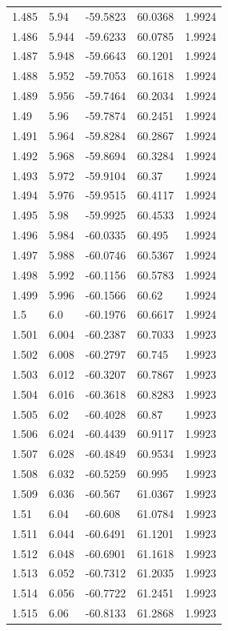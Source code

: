 \begin{tabular}{lllll}
1.485 & 5.94 & -59.5823 & 60.0368 & 1.9924 \\
1.486 & 5.944 & -59.6233 & 60.0785 & 1.9924 \\
1.487 & 5.948 & -59.6643 & 60.1201 & 1.9924 \\
1.488 & 5.952 & -59.7053 & 60.1618 & 1.9924 \\
1.489 & 5.956 & -59.7464 & 60.2034 & 1.9924 \\
1.49 & 5.96 & -59.7874 & 60.2451 & 1.9924 \\
1.491 & 5.964 & -59.8284 & 60.2867 & 1.9924 \\
1.492 & 5.968 & -59.8694 & 60.3284 & 1.9924 \\
1.493 & 5.972 & -59.9104 & 60.37 & 1.9924 \\
1.494 & 5.976 & -59.9515 & 60.4117 & 1.9924 \\
1.495 & 5.98 & -59.9925 & 60.4533 & 1.9924 \\
1.496 & 5.984 & -60.0335 & 60.495 & 1.9924 \\
1.497 & 5.988 & -60.0746 & 60.5367 & 1.9924 \\
1.498 & 5.992 & -60.1156 & 60.5783 & 1.9924 \\
1.499 & 5.996 & -60.1566 & 60.62 & 1.9924 \\
1.5 & 6.0 & -60.1976 & 60.6617 & 1.9924 \\
1.501 & 6.004 & -60.2387 & 60.7033 & 1.9923 \\
1.502 & 6.008 & -60.2797 & 60.745 & 1.9923 \\
1.503 & 6.012 & -60.3207 & 60.7867 & 1.9923 \\
1.504 & 6.016 & -60.3618 & 60.8283 & 1.9923 \\
1.505 & 6.02 & -60.4028 & 60.87 & 1.9923 \\
1.506 & 6.024 & -60.4439 & 60.9117 & 1.9923 \\
1.507 & 6.028 & -60.4849 & 60.9534 & 1.9923 \\
1.508 & 6.032 & -60.5259 & 60.995 & 1.9923 \\
1.509 & 6.036 & -60.567 & 61.0367 & 1.9923 \\
1.51 & 6.04 & -60.608 & 61.0784 & 1.9923 \\
1.511 & 6.044 & -60.6491 & 61.1201 & 1.9923 \\
1.512 & 6.048 & -60.6901 & 61.1618 & 1.9923 \\
1.513 & 6.052 & -60.7312 & 61.2035 & 1.9923 \\
1.514 & 6.056 & -60.7722 & 61.2451 & 1.9923 \\
1.515 & 6.06 & -60.8133 & 61.2868 & 1.9923 \\

\end{tabular}
